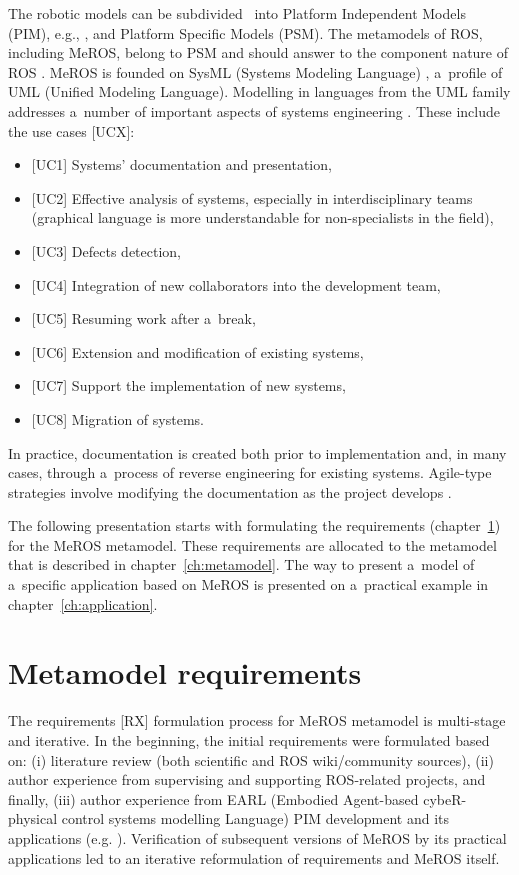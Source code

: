 \documentclass[11pt,oneside,a4paper]{report}
\begin{document}
	The robotic models can be subdivided~\cite{de2021survey} into Platform Independent Models (PIM), e.g., \cite{zielinski2017variable,zielinski2010motion,tasker2020,earl2020}, and Platform Specific Models (PSM). The metamodels of ROS, including MeROS, belong to PSM and should answer to the component nature of ROS \cite{Figat:2022:RAS,wenger2016model}.
	 MeROS is founded on SysML (Systems Modeling Language) \cite{omg-sysml16,Friedenthal:2015}, a~profile of UML (Unified Modeling Language). Modelling in languages from the UML family addresses a~number of important aspects of systems engineering \cite{chaudron2012effective}. These include the use cases [UCX]:
	\begin{itemize}
		\item $[$UC1] Systems' documentation and presentation,
		\item $[$UC2] Effective analysis of systems, especially in interdisciplinary teams (graphical language is more understandable for non-specialists in the field), 
		\item $[$UC3] Defects detection,
		\item $[$UC4] Integration of new collaborators into the development team,
		\item $[$UC5] Resuming work after a~break,
		\item $[$UC6] Extension and modification of existing systems,
		\item $[$UC7] Support the implementation of new systems,
		\item $[$UC8] Migration of systems.   
	\end{itemize}
	
	In practice, documentation is created both prior to implementation and, in many cases, through a~process of reverse  engineering \cite{canfora2007new} for existing systems. Agile-type strategies involve modifying the documentation as the project develops \cite{habib2021systematic}.
			
	The following presentation starts with formulating the requirements (chapter~\ref{ch:requirements}) for the MeROS metamodel. These requirements are allocated to the metamodel that is described in chapter~\ref{ch:metamodel}. The way to present a~model of a~specific application based on MeROS is presented on a~practical example in chapter~\ref{ch:application}.
	
	
\chapter{Metamodel requirements}
\label{ch:requirements}
	The requirements [RX] formulation process for MeROS metamodel is multi-stage and iterative. In the beginning, the initial requirements were formulated based on: (i) literature review (both scientific and ROS wiki/community sources), (ii) author experience from supervising and supporting ROS-related projects, and finally, (iii) author experience from EARL (Embodied Agent-based cybeR-physical control systems modelling Language) \cite{earl2020} PIM development and its applications (e.g. \cite{tasker2020,karwowski2021hubero,en14206693-grav-comp}). Verification of subsequent versions of MeROS by its practical applications led to an iterative reformulation of requirements and MeROS itself. 
	
\end{document}
